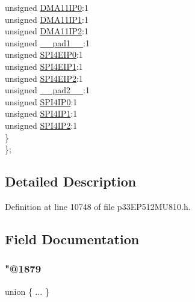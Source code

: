 \begin{DoxyCompactItemize}
\begin{tabbing}
\>\>unsigned \hyperlink{structtag_i_p_c30_b_i_t_s_a6b180b5f9f3e92c4b09b1bd927713a1d}{DMA11IP0}:1\\
\>\>unsigned \hyperlink{structtag_i_p_c30_b_i_t_s_a6f1800041cffd60bf51ee5bc98854f2d}{DMA11IP1}:1\\
\>\>unsigned \hyperlink{structtag_i_p_c30_b_i_t_s_a1e55b37cd45049a9a2d2421f754c0a4c}{DMA11IP2}:1\\
\>\>unsigned \hyperlink{structtag_i_p_c30_b_i_t_s_acaf2d0924a107ec6e8d2e31febaf66f9}{\_\_pad1\_\_}:1\\
\>\>unsigned \hyperlink{structtag_i_p_c30_b_i_t_s_a014ce08373afc7079245fa27735c3cb7}{SPI4EIP0}:1\\
\>\>unsigned \hyperlink{structtag_i_p_c30_b_i_t_s_a0d74a302141f0582f22094e32e886d94}{SPI4EIP1}:1\\
\>\>unsigned \hyperlink{structtag_i_p_c30_b_i_t_s_ad83cb60ff055994d4e696ca16c2b27dc}{SPI4EIP2}:1\\
\>\>unsigned \hyperlink{structtag_i_p_c30_b_i_t_s_a4d97cc5f7d51d22fc2bf3eab35c9cb7f}{\_\_pad2\_\_}:1\\
\>\>unsigned \hyperlink{structtag_i_p_c30_b_i_t_s_a11db5de2b7d3c2fce26c6842d7f9740f}{SPI4IP0}:1\\
\>\>unsigned \hyperlink{structtag_i_p_c30_b_i_t_s_aac82188760bffc0d0007e04877ed0f2a}{SPI4IP1}:1\\
\>\>unsigned \hyperlink{structtag_i_p_c30_b_i_t_s_ab73e96646562a4c063a9cbeda2ce65e0}{SPI4IP2}:1\\
\>\} \\
\}; \\

\end{tabbing}\end{DoxyCompactItemize}


\subsection{Detailed Description}


Definition at line 10748 of file p33\+E\+P512\+M\+U810.\+h.



\subsection{Field Documentation}
\mbox{\label{structtag_i_p_c30_b_i_t_s_ae103324a0b3b5c89566a374d2af852e7}} 
\subsubsection{\texorpdfstring{"@1879}{@1879}}
{\footnotesize\ttfamily union \{ ... \} }

